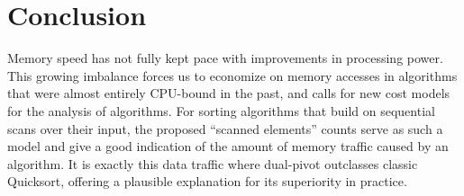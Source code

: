 \documentclass[]{theotage}
\begin{document}
\section{Conclusion}

Memory speed has not fully kept pace with improvements in processing power. 
This growing imbalance forces us to economize on memory accesses 
in algorithms that were almost entirely CPU-bound in the past, 
and calls for new cost models for the analysis of algorithms.
For sorting algorithms that build on sequential scans over their input,
the proposed ``scanned elements'' counts serve as such a model and 
give a good indication of the amount of memory traffic caused by an algorithm.
It is exactly this data traffic where dual-pivot outclasses classic Quicksort,
offering a plausible explanation for its superiority in practice.




\end{document}
